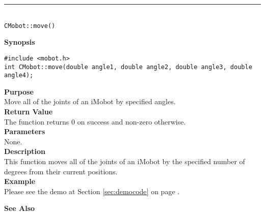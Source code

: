 \noindent
\vspace{5pt}
\rule{4.5in}{0.015in}\\
\noindent
{\LARGE \texttt{CMobot::move()}}\\
{}

\noindent
{\bf Synopsis}\\
\begin{verbatim}
#include <mobot.h>
int CMobot::move(double angle1, double angle2, double angle3, double angle4);
\end{verbatim}

\noindent
{\bf Purpose}\\
Move all of the joints of an iMobot by specified angles.\\

\noindent
{\bf Return Value}\\
The function returns 0 on success and non-zero otherwise.\\

\noindent
{\bf Parameters}\\
None.\\

\noindent
{\bf Description}\\
This function moves all of the joints of an iMobot by the specified number of degrees
from their current positions. \\

\noindent
{\bf Example}\\
Please see the demo at Section \ref{sec:democode} on page \pageref{sec:democode}.\\
\noindent

\noindent
{\bf See Also}\\

